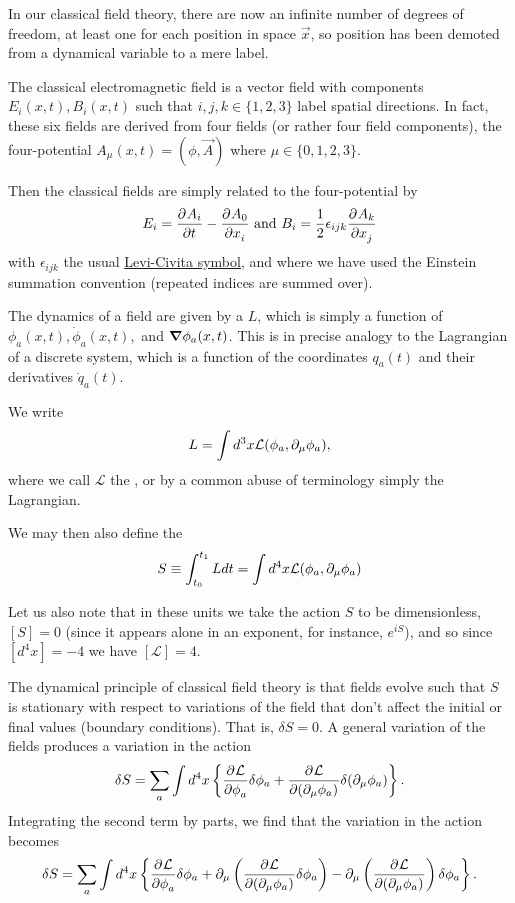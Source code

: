 In our classical field theory, there are now an infinite number of degrees of freedom, at least one for each position in space $\vec x$, so position has been demoted from a dynamical variable to a mere label.

\begin{exm}
The classical electromagnetic field is a vector field with components $E_i(x,t), B_i(x,t)$ such that $i,j,k\in \{1,2,3\}$ label spatial directions. In fact, these six fields are derived from four fields (or rather four field components), the four-potential $A_\mu(x,t)=(\phi,\vec{A})$ where $\mu\in\{0,1,2,3\}$.

Then the classical fields are simply related to the four-potential by
\begin{equation}
E_i=\P{A_i}{t}-\P{A_0}{x_i} \text{ and } B_i=\frac{1}{2}\epsilon_{ijk} \P{A_k}{x_j}
\end{equation}
with $\epsilon_{ijk}$ the usual \href{https://en.wikipedia.org/wiki/Levi-Civita_symbol}{Levi-Civita symbol}, and where we have used the Einstein summation convention (repeated indices are summed over).
\end{exm}

The dynamics of a field are given by a  $L$, which is simply a function of $\phi_a(x,t), \dot \phi_a(x,t),$ and $\grad \phi_a(x,t)$. This is in precise analogy to the Lagrangian of a discrete system, which is a function of the coordinates $q_a(t)$ and their derivatives $\dot q_a(t)$.
\begin{defn}
We write
\begin{equation}
L=\int d^3 x \mathcal{L}(\phi_a, \p_\mu \phi_a),
\end{equation}
where we call $\mathcal{L}$ the , or by a common abuse of terminology simply the Lagrangian.
\end{defn}
\begin{defn}
We may then also define the 
\begin{equation}
S\equiv \int_{t_0}^{t_1}L dt = \int d^4x \mathcal{L}(\phi_a,\p_\mu \phi_a)
\end{equation}
\end{defn}
Let us also note that in these units we take the action $S$ to be dimensionless, $[S]=0$ (since it appears alone in an exponent, for instance, $e^{iS}$), and so since $[d^4x]=-4$ we have $[\mathcal{L}]=4.$

The dynamical principle of classical field theory is that fields evolve such that $S$ is stationary with respect to variations of the field that don't affect the initial or final values (boundary conditions). That is, $\delta S=0$. A general variation of the fields produces a variation in the action
$$\delta S=\sum_a \int d^4 x\left \{ \P{\mathcal{L}}{\phi_a}\delta\phi_a +\P{\mathcal{L}}{(\p_\mu\phi_a)} \delta(\p_\mu \phi_a)\right\}.$$
Integrating the second term by parts, we find that the variation in the action becomes
$$\delta S= \sum_a \int d^4x \left\{ \P{\mathcal{L}}{\phi_a}\delta \phi_a +\p_\mu \left( \P{\mathcal{L}}{(\p_\mu \phi_a)}\delta \phi_a\right)-\p_\mu \left(\P{\mathcal{L}}{(\p_\mu \phi_a)}\right)\delta \phi_a\right\}.$$

